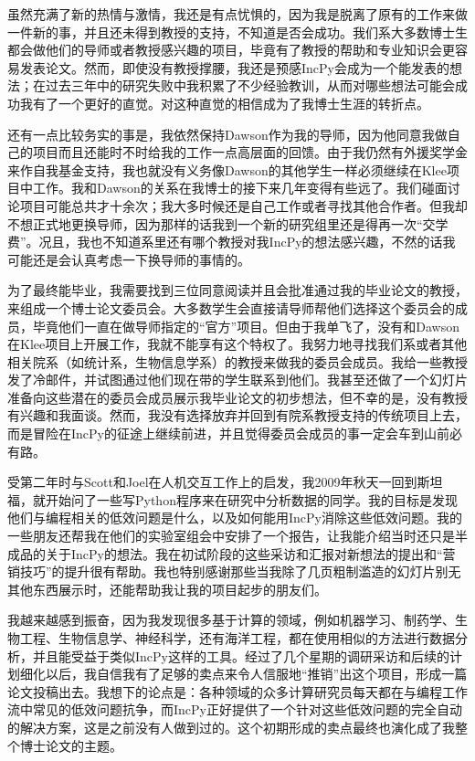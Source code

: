 \documentclass[letter,12pt]{book}
\begin{document}
\begin{CJK}{UTF8}{gbsn}
虽然充满了新的热情与激情，我还是有点忧惧的，因为我是脱离了原有的工作来做一件新的事，并且还未得到教授的支持，不知道是否会成功。我们系大多数博士生都会做他们的导师或者教授感兴趣的项目，毕竟有了教授的帮助和专业知识会更容易发表论文。然而，即使没有教授撑腰，我还是预感IncPy会成为一个能发表的想法；在过去三年中的研究失败中我积累了不少经验教训，从而对哪些想法可能会成功我有了一个更好的直觉。对这种直觉的相信成为了我博士生涯的转折点。

还有一点比较务实的事是，我依然保持Dawson作为我的导师，因为他同意我做自己的项目而且还能时不时给我的工作一点高层面的回馈。由于我仍然有外援奖学金来作自我基金支持，我也就没有义务像Dawson的其他学生一样必须继续在Klee项目中工作。我和Dawson的关系在我博士的接下来几年变得有些远了。我们碰面讨论项目可能总共才十余次；我大多时候还是自己工作或者寻找其他合作者。但我却不想正式地更换导师，因为那样的话我到一个新的研究组里还是得再一次“交学费”。况且，我也不知道系里还有哪个教授对我IncPy的想法感兴趣，不然的话我可能还是会认真考虑一下换导师的事情的。

为了最终能毕业，我需要找到三位同意阅读并且会批准通过我的毕业论文的教授，来组成一个博士论文委员会。大多数学生会直接请导师帮他们选择这个委员会的成员，毕竟他们一直在做导师指定的“官方”项目。但由于我单飞了，没有和Dawson在Klee项目上开展工作，我就不能享有这个特权了。我努力地寻找我们系或者其他相关院系（如统计系，生物信息学系）的教授来做我的委员会成员。我给一些教授发了冷邮件，并试图通过他们现在带的学生联系到他们。我甚至还做了一个幻灯片准备向这些潜在的委员会成员展示我毕业论文的初步想法，但不幸的是，没有教授有兴趣和我面谈。然而，我没有选择放弃并回到有院系教授支持的传统项目上去，而是冒险在IncPy的征途上继续前进，并且觉得委员会成员的事一定会车到山前必有路。

\breakline

受第二年时与Scott和Joel在人机交互工作上的启发，我2009年秋天一回到斯坦福，就开始问了一些写Python程序来在研究中分析数据的同学。我的目标是发现他们与编程相关的低效问题是什么，以及如何能用IncPy消除这些低效问题。我的一些朋友还帮我在他们的实验室组会中安排了一个报告，让我能介绍当时还只是半成品的关于IncPy的想法。我在初试阶段的这些采访和汇报对新想法的提出和“营销技巧”的提升很有帮助。我也特别感谢那些当我除了几页粗制滥造的幻灯片别无其他东西展示时，还能帮助我让我的项目起步的朋友们。

我越来越感到振奋，因为我发现很多基于计算的领域，例如机器学习、制药学、生物工程、生物信息学、神经科学，还有海洋工程，都在使用相似的方法进行数据分析，并且能受益于类似IncPy这样的工具。经过了几个星期的调研采访和后续的计划细化以后，我自信我有了足够的卖点来令人信服地“推销”出这个项目，形成一篇论文投稿出去。我想下的论点是：各种领域的众多计算研究员每天都在与编程工作流中常见的低效问题抗争，而IncPy正好提供了一个针对这些低效问题的完全自动的解决方案，这是之前没有人做到过的。这个初期形成的卖点最终也演化成了我整个博士论文的主题。


\end{CJK}
\end{document}
